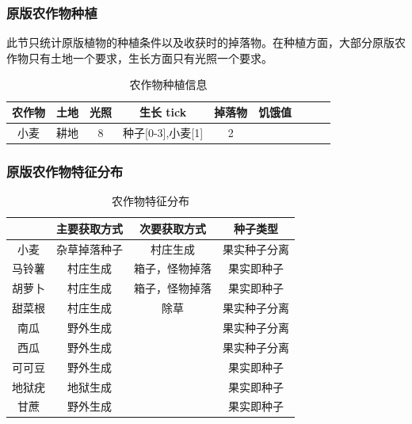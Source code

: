 \subsubsection{原版农作物种植}

此节只统计原版植物的种植条件以及收获时的掉落物。在种植方面，大部分原版农作物只有土地一个要求，生长方面只有光照一个要求。

\begin{table}[H]
    \centering
    \caption{农作物种植信息}
    \label{table:农作物种植信息}
    \setlength{\tabcolsep}{4mm}
    \begin{tabular}{c|cccccccc}
        \toprule
        \textbf{农作物} & \textbf{土地} & \textbf{光照} & \textbf{生长 tick} & \textbf{掉落物} & \textbf{饥饿值} \\
        \midrule
        小麦 & 耕地 & 8 & 种子[0-3],小麦[1] & 2 \\
        \bottomrule
    \end{tabular}
\end{table}

\subsubsection{原版农作物特征分布}

\begin{table}[H]
    \centering
    \caption{农作物特征分布}
    \label{table:农作物特征分布}
    \setlength{\tabcolsep}{4mm}
    \begin{tabular}{c|ccc}
        \toprule
        & \textbf{主要获取方式} & \textbf{次要获取方式} & \textbf{种子类型} \\
        \midrule
        小麦 & 杂草掉落种子 & 村庄生成 & 果实种子分离 \\
        马铃薯 & 村庄生成 & 箱子，怪物掉落 & 果实即种子 \\
        胡萝卜 & 村庄生成 & 箱子，怪物掉落 & 果实即种子 \\
        甜菜根 & 村庄生成 & 除草 & 果实种子分离 \\
        南瓜 & 野外生成 & & 果实种子分离 \\
        西瓜 & 野外生成 & & 果实种子分离 \\
        可可豆 & 野外生成 & & 果实即种子 \\
        地狱疣 & 地狱生成 & & 果实即种子 \\
        甘蔗 & 野外生成 & & 果实即种子 \\
        \bottomrule
    \end{tabular}
\end{table}


\newpage